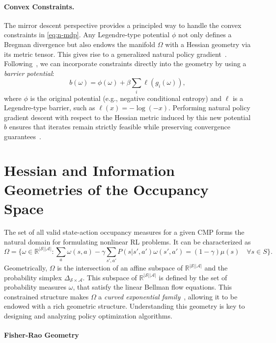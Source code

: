 \documentclass{article}
\theoremstyle{plain}
\theoremstyle{definition}
\theoremstyle{remark}
\newcommand{\sS}{\mathcal{S}}
\newcommand{\sA}{\mathcal{A}}
\begin{document}
\paragraph{Convex Constraints.} The mirror descent perspective provides a principled way to handle the convex constraints in \eqref{eq:n-mdp}. 
Any Legendre-type potential $\phi$ not only defines a Bregman divergence but also endows the manifold $\Omega$ with a Hessian geometry via its metric tensor. 
This gives rise to a generalized natural policy gradient~\citep{muller2024geometry}. 
Following~\citep{milosevic2024embedding, milosevic2025central}, we can incorporate constraints directly into the geometry by using a \emph{barrier potential}:
\[
b(\omega) = \phi(\omega) + \beta \sum_i \ell(g_i(\omega)),
\]
where $\phi$ is the original potential (e.g., negative conditional entropy) and $\ell$ is a Legendre-type barrier, such as $\ell(x) = -\log(-x)$. Performing natural policy gradient descent with respect to the Hessian metric induced by this new potential $b$ ensures that iterates remain strictly feasible while preserving convergence guarantees~\citep{alvarez2004hessian}.

\section{Hessian and Information Geometries of the Occupancy Space}\label{app:hessian-geom}

The set of all valid state-action occupancy measures for a given CMP forms the natural domain for formulating nonlinear RL problems. 
It can be characterized as
$$\Omega = \{\omega \in \mathbb{R}^{|\sS||\sA|}: \sum_a \omega(s,a) - \gamma \sum_{s',a'} P(s|s',a')\omega(s',a') = (1-\gamma)\mu(s) \quad \forall s \in S \}.$$
Geometrically, $\Omega$ is the intersection of an affine subspace of $\mathbb{R}^{|\sS||\sA|}$ and the probability simplex $\Delta_{\sS\times\sA}$. 
This subspace of $\mathbb{R}^{|\sS||\sA|}$ is defined by the set of probability measures $\omega$, that satisfy the linear Bellman flow equations. 
This constrained structure makes $\Omega$ a \emph{curved exponential family}~\citep{amari1982differential}, allowing it to be endowed with a rich geometric structure. 
Understanding this geometry is key to designing and analyzing policy optimization algorithms.

\paragraph{Fisher-Rao Geometry}
\end{document}
